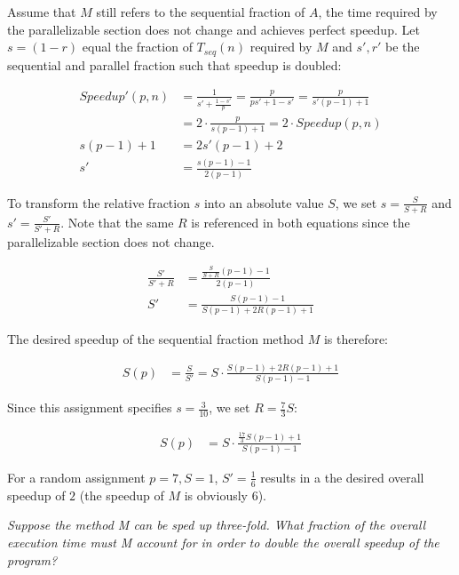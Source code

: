 \documentclass[a4paper,10pt]{article}
\begin{document}
\vspace{3mm}

Assume that $M$ still refers to the sequential fraction of $A$, the time required by
the parallelizable section does not change and achieves perfect speedup.
Let $s = (1 - r)$ equal the fraction of
$T_{seq}(n)$ required by $M$ and $s', r'$ be the sequential and parallel fraction
such that speedup is doubled:

\begin{align}
Speedup'(p, n) &= \frac{1}{s' + \frac{1 - s'}{p}} = \frac{p}{ps' + 1 - s'} = \frac{p}{s'(p - 1) + 1} \\
               &= 2 \cdot \frac{p}{s(p - 1) + 1} = 2 \cdot Speedup(p, n) \\
s(p - 1) + 1   &= 2s'(p - 1) + 2 \\
s'             &= \frac{s(p - 1) - 1}{2(p - 1)}
\end{align}

To transform the relative fraction $s$ into an absolute value $S$, we set $s = \frac{S}{S + R}$
and $s' = \frac{S'}{S' + R}$. Note that the same $R$ is referenced in both equations since
the parallelizable section does not change.

\begin{align}
\frac{S'}{S' + R} &= \frac{\frac{S}{S + R}(p - 1) - 1}{2(p - 1)} \\
S'                &= \frac{S(p - 1) - 1}{S(p - 1) + 2R(p - 1) + 1}
\end{align}


The desired speedup of the sequential fraction method $M$ is therefore:

\begin{align}
S(p) &= \frac{S}{S'} = S \cdot \frac{S(p - 1) + 2R(p - 1) + 1}{S(p - 1) - 1}
\end{align}

Since this assignment specifies $s = \frac{3}{10}$, we set $R = \frac{7}{3}S$:

\begin{align}
S(p) &= S \cdot \frac{\frac{17}{3}S(p - 1) + 1}{S(p - 1) - 1}
\end{align}

For a random assignment $p = 7, S = 1$, $S' = \frac{1}{6}$ results in a the desired
overall speedup of $2$ (the speedup of $M$ is obviously $6$).

\vspace{3mm}

\emph{Suppose the method M can be sped up three-fold. What fraction of the overall
execution time must M account for in order to double the overall speedup of
the program?}
\end{document}
